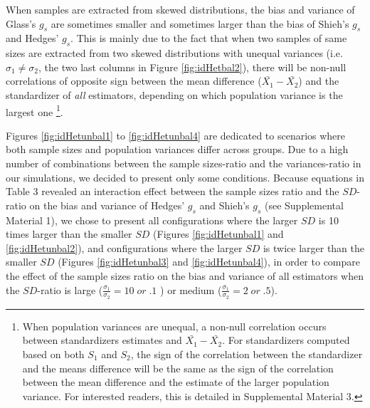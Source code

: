 \documentclass[
  english,
  man,floatsintext]{apa6}
\begin{document}
When samples are extracted from skewed distributions, the bias and variance of Glass's \(g_s\) are sometimes smaller and sometimes larger than the bias of Shieh's \(g_s\) and Hedges' \(g_s\). This is mainly due to the fact that when two samples of same sizes are extracted from two skewed distributions with unequal variances (i.e.~\(\sigma_1 \neq\sigma_2\), the two last columns in Figure \ref{fig:idHetbal2}), there will be non-null correlations of opposite sign between the mean difference (\(\bar{X_1}-\bar{X_2}\)) and the standardizer of \emph{all} estimators, depending on which population variance is the largest one \footnote{When population variances are unequal, a non-null correlation occurs between standardizers estimates and $\bar{X_1}-\bar{X_2}$. For standardizers computed based on both $S_1$ and $S_2$, the sign of the correlation between the standardizer and the means difference will be the same as the sign of the correlation between the mean difference and the estimate of the larger population variance. For interested readers, this is detailed in Supplemental Material 3.}.

Figures \ref{fig:idHetunbal1} to \ref{fig:idHetunbal4} are dedicated to scenarios where both sample sizes and population variances differ across groups. Due to a high number of combinations between the sample sizes-ratio and the variances-ratio in our simulations, we decided to present only some conditions. Because equations in Table 3 revealed an interaction effect between the sample sizes ratio and the \(SD\)-ratio on the bias and variance of Hedges' \(g_s\) and Shieh's \(g_s\) (see Supplemental Material 1), we chose to present all configurations where the larger \(SD\) is 10 times larger than the smaller \(SD\) (Figures \ref{fig:idHetunbal1} and \ref{fig:idHetunbal2}), and configurations where the larger \(SD\) is twice larger than the smaller \(SD\) (Figures \ref{fig:idHetunbal3} and \ref{fig:idHetunbal4}), in order to compare the effect of the sample sizes ratio on the bias and variance of all estimators when the \(SD\)-ratio is large (\(\frac{\sigma_1}{\sigma_2}=10 \; or \; .1\) ) or medium (\(\frac{\sigma_1}{\sigma_2}=2 \; or \; .5\)).
\end{document}
